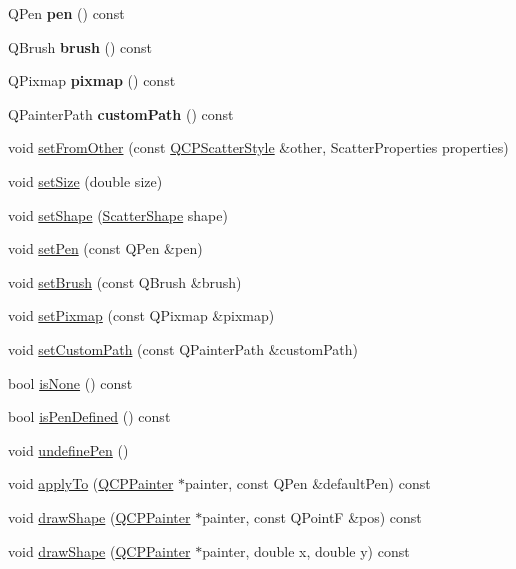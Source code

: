 \begin{DoxyCompactItemize}
Q\+Pen {\bfseries pen} () const
\item 
\mbox{\label{classQCPScatterStyle_adc4f66aed84f1d7a3a5aabf4f48f31a6}} 
Q\+Brush {\bfseries brush} () const
\item 
\mbox{\label{classQCPScatterStyle_a9b2d1a2ec0aac0c74f7582d14050e93a}} 
Q\+Pixmap {\bfseries pixmap} () const
\item 
\mbox{\label{classQCPScatterStyle_aef1fac84c9830fd97f2a8568e605e372}} 
Q\+Painter\+Path {\bfseries custom\+Path} () const
\item 
void \hyperlink{classQCPScatterStyle_a7d59ba8864914f765817841089e436f1}{set\+From\+Other} (const \hyperlink{classQCPScatterStyle}{Q\+C\+P\+Scatter\+Style} \&other, Scatter\+Properties properties)
\item 
void \hyperlink{classQCPScatterStyle_aaefdd031052892c4136129db68596e0f}{set\+Size} (double size)
\item 
void \hyperlink{classQCPScatterStyle_a7c641c4d4c6d29cb705d3887cfce91c1}{set\+Shape} (\hyperlink{classQCPScatterStyle_adb31525af6b680e6f1b7472e43859349}{Scatter\+Shape} shape)
\item 
void \hyperlink{classQCPScatterStyle_a761f1f229cc0ca4703e1e2b89f6dd1ba}{set\+Pen} (const Q\+Pen \&pen)
\item 
void \hyperlink{classQCPScatterStyle_a74d692aaeb8d4b36d6f7d510e44264b1}{set\+Brush} (const Q\+Brush \&brush)
\item 
void \hyperlink{classQCPScatterStyle_a5fb611d46acfac520d7b89a1c71d9246}{set\+Pixmap} (const Q\+Pixmap \&pixmap)
\item 
void \hyperlink{classQCPScatterStyle_a96a3e949f90b2afe5677ca9412a12a1e}{set\+Custom\+Path} (const Q\+Painter\+Path \&custom\+Path)
\item 
bool \hyperlink{classQCPScatterStyle_a72db6bcb1e1abd6e53c1315dd3dea7e4}{is\+None} () const
\item 
bool \hyperlink{classQCPScatterStyle_a47077eb6450fe9a788f833e4ec1b1d5a}{is\+Pen\+Defined} () const
\item 
void \hyperlink{classQCPScatterStyle_acabc2a8c83d650b946f50c3166b6c35e}{undefine\+Pen} ()
\item 
void \hyperlink{classQCPScatterStyle_afd8044ece445300499ca0dc164821e0f}{apply\+To} (\hyperlink{classQCPPainter}{Q\+C\+P\+Painter} $\ast$painter, const Q\+Pen \&default\+Pen) const
\item 
void \hyperlink{classQCPScatterStyle_a89b5105e6027bfcbfeefed9d201b607c}{draw\+Shape} (\hyperlink{classQCPPainter}{Q\+C\+P\+Painter} $\ast$painter, const Q\+PointF \&pos) const
\item 
void \hyperlink{classQCPScatterStyle_a95c297b114c77c22428ef40f54620ddf}{draw\+Shape} (\hyperlink{classQCPPainter}{Q\+C\+P\+Painter} $\ast$painter, double x, double y) const
\end{DoxyCompactItemize}
